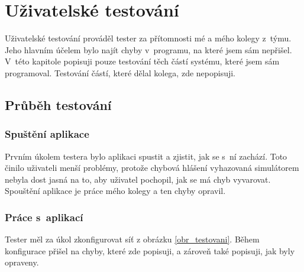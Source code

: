 
\chapter{Uživatelské testování}

Uživatelské testování prováděl tester za přítomnosti mé a mého kolegy z~týmu. Jeho hlavním účelem bylo najít chyby v~programu, na které jsem sám nepřišel. V~této kapitole popisuji pouze testování těch částí systému, které jsem sám programoval. Testování částí, které dělal kolega, zde nepopisuji.






\section{Průběh testování}


\subsection{Spuštění aplikace}

Prvním úkolem testera bylo aplikaci spustit a zjistit, jak se s~ní zachází. Toto činilo uživateli menší problémy, protože chybová hlášení vyhazovaná simulátorem nebyla dost jasná na to, aby uživatel pochopil, jak se má chyb vyvarovat. Spouštění aplikace je práce mého kolegy a ten chyby opravil.


\subsection{Práce s~aplikací}

Tester měl za úkol zkonfigurovat síť z obrázku \ref{obr_testovani}. Během konfigurace přišel na chyby, které zde popisuji, a zároveň také popisuji, jak byly opraveny.

